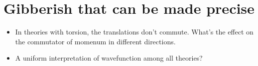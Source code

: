 \documentclass{report}
\begin{document}
\chapter{Gibberish that can be made precise}

\begin{itemize}
  \item In theories with torsion, the translations don't commute. What's the effect on the commutator of momenum in different directions.

  \item A uniform interpretation of wavefunction among all theories?

\end{itemize}
\end{document}
